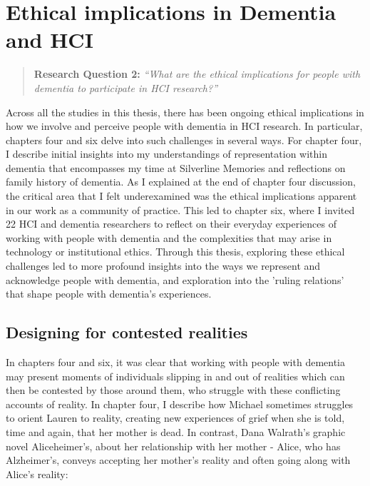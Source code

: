 \section{Ethical implications in Dementia and HCI}
\label{Discussion:RQ2}
\begin{quote}
\textbf{    Research Question 2:
}    
\textit{    “What are the ethical implications for people with dementia to participate in HCI research?”}
\end{quote}
Across all the studies in this thesis, there has been ongoing ethical implications in how we involve and perceive people with dementia in HCI research. In particular, chapters four and six delve into such challenges in several ways. For chapter four,  I describe initial insights into my understandings of representation within dementia that encompasses my time at Silverline Memories and reflections on family history of dementia. As I explained at the end of chapter four discussion, the critical area that I felt underexamined was the ethical implications apparent in our work as a community of practice. This led to chapter six, where I invited 22 HCI and dementia researchers to reflect on their everyday experiences of working with people with dementia and the complexities that may arise in technology or institutional ethics. Through this thesis, exploring these ethical challenges led to more profound insights into the ways we represent and acknowledge people with dementia, and exploration into the 'ruling relations' that shape people with dementia's experiences. 

\subsection{Designing for contested realities}
\label{RQ2:ContestedRealities}
In chapters four and six, it was clear that working with people with dementia may present moments of individuals slipping in and out of realities which can then be contested by those around them, who struggle with these conflicting accounts of reality. In chapter four, I describe how Michael sometimes struggles to orient Lauren to reality, creating new experiences of grief when she is told, time and again, that her mother is dead. In contrast, Dana Walrath's graphic novel Aliceheimer's, about her relationship with her mother - Alice, who has Alzheimer's, conveys accepting her mother's reality and often going along with Alice's reality:

